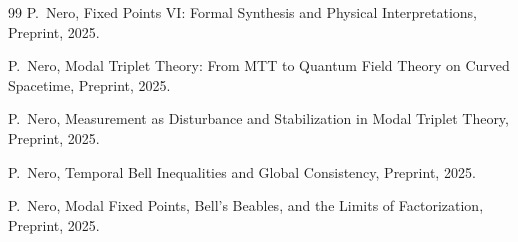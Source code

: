 \documentclass[11pt]{article}
\begin{document}
\begin{thebibliography}{99}
P.~Nero,
\newblock Fixed Points VI: Formal Synthesis and Physical Interpretations,
\newblock Preprint, 2025.

P.~Nero,
\newblock Modal Triplet Theory: From MTT to Quantum Field Theory on Curved Spacetime,
\newblock Preprint, 2025.

P.~Nero,
\newblock Measurement as Disturbance and Stabilization in Modal Triplet Theory,
\newblock Preprint, 2025.

P.~Nero,
\newblock Temporal Bell Inequalities and Global Consistency,
\newblock Preprint, 2025.

P.~Nero,
\newblock Modal Fixed Points, Bell's Beables, and the Limits of Factorization,
\newblock Preprint, 2025.

\end{thebibliography}
\end{document}
